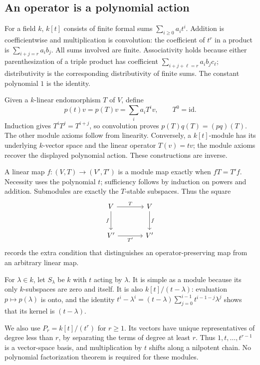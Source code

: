 \documentclass[11pt]{article}
\theoremstyle{definition}
\theoremstyle{remark}\newtheorem{remark}[theorem]{Remark}
\newcommand{\id}{\mathrm{id}}
\begin{document}
\subsection{An operator is a polynomial action}
\label{m:operators}

For a field $k$, $k[t]$ consists of finite formal sums
$\sum_{i\geq0}a_it^i$. Addition is coefficientwise and multiplication
is convolution: the coefficient of $t^r$ in a product is
$\sum_{i+j=r}a_ib_j$. All sums involved are finite. Associativity
holds because either parenthesization of a triple product has coefficient
$\sum_{i+j+\ell=r}a_ib_jc_\ell$; distributivity is the corresponding
distributivity of finite sums. The constant polynomial $1$ is the identity.

Given a $k$-linear endomorphism $T$ of $V$, define
\[
 p(t)v=p(T)v=\sum_i a_iT^iv,\qquad T^0=\id.
\]
Induction gives $T^iT^j=T^{i+j}$, so convolution proves
$p(T)q(T)=(pq)(T)$. The other module axioms follow from linearity.
Conversely, a $k[t]$-module has its underlying $k$-vector space and
the linear operator $T(v)=tv$; the module axioms recover the displayed
polynomial action. These constructions are inverse.

A linear map $f:(V,T)\to(V',T')$ is a module map exactly when
$fT=T'f$. Necessity uses the polynomial $t$; sufficiency follows by
induction on powers and addition. Submodules are exactly the
$T$-stable subspaces. Thus the square
\[
\begin{tikzcd}[column sep=large,row sep=large]
V\arrow[r,"T"]\arrow[d,"f"']&V\arrow[d,"f"]\\
V'\arrow[r,"T'"']&V'
\end{tikzcd}
\]
records the extra condition that distinguishes an operator-preserving
map from an arbitrary linear map.

For $\lambda\in k$, let $S_\lambda$ be $k$ with $t$ acting by
$\lambda$. It is simple as a module because its only $k$-subspaces
are zero and itself. It is also $k[t]/(t-\lambda)$: evaluation
$p\mapsto p(\lambda)$ is onto, and the identity
$t^i-\lambda^i=(t-\lambda)\sum_{j=0}^{i-1}t^{i-1-j}\lambda^j$
shows that its kernel is $(t-\lambda)$.

We also use $P_r=k[t]/(t^r)$ for $r\geq1$. Its vectors have unique
representatives of degree less than $r$, by separating the terms of
degree at least $r$. Thus $1,t,\ldots,t^{r-1}$ is a vector-space
basis, and multiplication by $t$ shifts along a nilpotent chain.
No polynomial factorization theorem is required for these modules.
\end{document}
